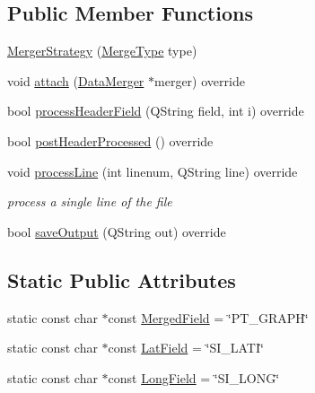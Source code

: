 \subsection*{Public Member Functions}
\begin{DoxyCompactItemize}
\item 
\mbox{\hyperlink{classdisplace_1_1workers_1_1_merger_strategy_a86148f0a283efde00c1b05ce39861c7d}{Merger\+Strategy}} (\mbox{\hyperlink{classdisplace_1_1workers_1_1_merger_strategy_a2836a7e3ec6a70b4a868057840d52915}{Merge\+Type}} type)
\item 
void \mbox{\hyperlink{classdisplace_1_1workers_1_1_merger_strategy_addc43b70950fe76253fcfcf7975fc299}{attach}} (\mbox{\hyperlink{classdisplace_1_1workers_1_1_data_merger}{Data\+Merger}} $\ast$merger) override
\item 
bool \mbox{\hyperlink{classdisplace_1_1workers_1_1_merger_strategy_a5cfb5bda0541f3f7659aa13e0240fc57}{process\+Header\+Field}} (Q\+String field, int i) override
\item 
bool \mbox{\hyperlink{classdisplace_1_1workers_1_1_merger_strategy_a13652dd462cd7e666222952d84963132}{post\+Header\+Processed}} () override
\item 
void \mbox{\hyperlink{classdisplace_1_1workers_1_1_merger_strategy_aa434bb1a89c47003426c9d7d41995d58}{process\+Line}} (int linenum, Q\+String line) override
\begin{DoxyCompactList}\small\item\em process a single line of the file \end{DoxyCompactList}\item 
bool \mbox{\hyperlink{classdisplace_1_1workers_1_1_merger_strategy_a5e0908a7d6b0a75f4e877711a386d7be}{save\+Output}} (Q\+String out) override
\end{DoxyCompactItemize}
\subsection*{Static Public Attributes}
\begin{DoxyCompactItemize}
\item 
static const char $\ast$const \mbox{\hyperlink{classdisplace_1_1workers_1_1_merger_strategy_acacd6c613d758f0cd5d2395b453ca6ad}{Merged\+Field}} = \char`\"{}P\+T\+\_\+\+G\+R\+A\+PH\char`\"{}
\item 
static const char $\ast$const \mbox{\hyperlink{classdisplace_1_1workers_1_1_merger_strategy_af199860f186a2ff89c03981792e4080f}{Lat\+Field}} = \char`\"{}S\+I\+\_\+\+L\+A\+TI\char`\"{}
\item 
static const char $\ast$const \mbox{\hyperlink{classdisplace_1_1workers_1_1_merger_strategy_aebef512db4733490f76e2e3bdc03cc0b}{Long\+Field}} = \char`\"{}S\+I\+\_\+\+L\+O\+NG\char`\"{}
\end{DoxyCompactItemize}


